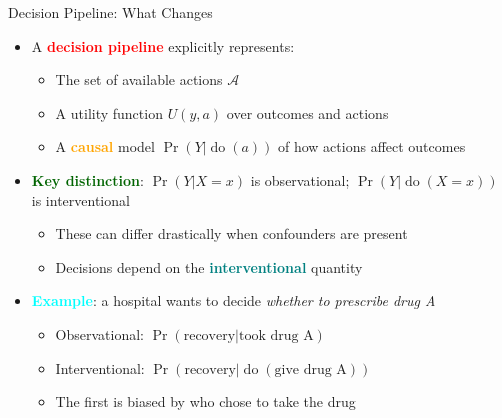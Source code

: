 \documentclass[
  10pt,
  ignorenonframetext,
]{beamer}
\providecommand{\tightlist}{%
  \setlength{\itemsep}{0pt}\setlength{\parskip}{0pt}}
\begin{document}
\begin{frame}{Decision Pipeline: What Changes}
\label{decision-pipeline-what-changes}
\begin{itemize}
\tightlist
\item
  A \textbf{\textcolor{red}{decision pipeline}} explicitly represents:

  \begin{itemize}
  \tightlist
  \item
    The set of available actions \(\mathcal{A}\)
  \item
    A utility function \(U(y, a)\) over outcomes and actions
  \item
    A \textbf{\textcolor{orange}{causal}} model
    \(\Pr(Y | \operatorname{do}(a))\) of how actions affect outcomes
  \end{itemize}
\item
  \textbf{\textcolor{darkgreen}{Key distinction}}: \(\Pr(Y | X = x)\) is
  observational; \(\Pr(Y | \operatorname{do}(X = x))\) is interventional

  \begin{itemize}
  \tightlist
  \item
    These can differ drastically when confounders are present
  \item
    Decisions depend on the \textbf{\textcolor{teal}{interventional}}
    quantity
  \end{itemize}
\item
  \textbf{\textcolor{cyan}{Example}}: a hospital wants to decide
  \emph{whether to prescribe drug A}

  \begin{itemize}
  \tightlist
  \item
    Observational: \(\Pr(\text{recovery} | \text{took drug A})\)
  \item
    Interventional:
    \(\Pr(\text{recovery} | \operatorname{do}(\text{give drug A}))\)
  \item
    The first is biased by who chose to take the drug
  \end{itemize}
\end{itemize}
\end{frame}
\end{document}
